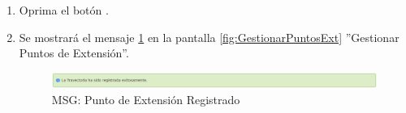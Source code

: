 \begin{enumerate}
			\item Oprima el botón \IUAceptar.
			
			\item Se mostrará el mensaje \ref{fig:pextRegistrado} en la pantalla \ref{fig:GestionarPuntosExt} ''Gestionar Puntos de Extensión''.
			
			\begin{figure}[htbp!]
				\begin{center}
					\includegraphics[scale=0.5]{roles/lider/puntosExtension/pantallas/IU6-1-4-1MSG1}
					\caption{MSG: Punto de Extensión Registrado}
					\label{fig:pextRegistrado}
				\end{center}
			\end{figure}
			\end{enumerate}